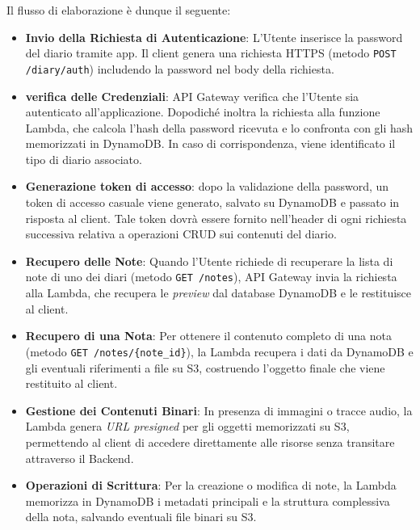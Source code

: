 \documentclass[a4paper,12pt]{article}
\newcommand{\ignoreglossary}{}
\begin{document}
Il flusso di elaborazione è dunque il seguente:
\begin{itemize}
    \item \textbf{Invio della Richiesta di Autenticazione}: L'Utente inserisce la password del diario tramite app. Il client genera una richiesta HTTPS (metodo \texttt{POST /diary/auth}) includendo la password nel body della richiesta.
    
    \item \textbf{\ignoreglossary{verifica} delle Credenziali}: API Gateway \ignoreglossary{verifica} che l'Utente sia autenticato all'applicazione. Dopodiché inoltra la richiesta alla funzione Lambda, che calcola l'hash della password ricevuta e lo confronta con gli hash memorizzati in DynamoDB. In caso di corrispondenza, viene identificato il tipo di diario associato.
    
    \item \textbf{Generazione token di accesso}: dopo la \ignoreglossary{validazione} della password, un token di accesso casuale viene generato, salvato su DynamoDB e passato in risposta al client. Tale token dovrà essere fornito nell'header di ogni richiesta successiva relativa a operazioni CRUD sui contenuti del diario.
    
    \item \textbf{Recupero delle Note}: Quando l'Utente richiede di recuperare la lista di note di uno dei diari (metodo \texttt{GET /notes}), API Gateway invia la richiesta alla Lambda, che recupera le \textit{preview} dal database DynamoDB e le restituisce al client.
    
    \item \textbf{Recupero di una Nota}: Per ottenere il contenuto completo di una nota (metodo \texttt{GET /notes/\{note\_id\}}), la Lambda recupera i dati da DynamoDB e gli eventuali riferimenti a file su S3, costruendo l'oggetto finale che viene restituito al client.
    
    \item \textbf{Gestione dei Contenuti Binari}: In presenza di immagini o tracce audio, la Lambda genera \textit{URL presigned} per gli oggetti memorizzati su S3, permettendo al client di accedere direttamente alle risorse senza transitare attraverso il Backend.
    
    \item \textbf{Operazioni di Scrittura}: Per la creazione o modifica di note, la Lambda memorizza in DynamoDB i metadati principali e la struttura complessiva della nota, salvando eventuali file binari su S3.
    

\end{itemize}
\end{document}
